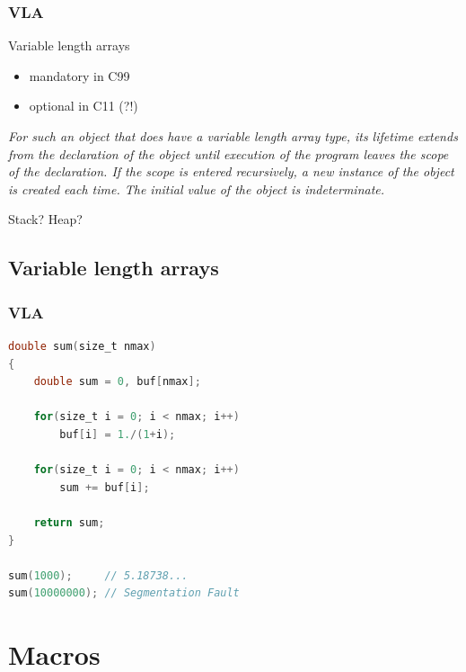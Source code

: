 \documentclass[12pt,compress]{beamer}
\begin{document}
\begin{frame}
    \frametitle{VLA}

    Variable length arrays
    \begin{itemize}
    \item mandatory in C99
    \item optional in C11 (?!)
    \end{itemize}

    \vfill

    {{\it For such an object that does have a variable length array type, its
    lifetime extends from the declaration of the object until execution of the
    program leaves the scope of the declaration. If the scope is entered
    recursively, a new instance of the object is created each time. The initial
    value of the object is indeterminate.}} 

    \vfill

    {
        \begin{center}
    {\Large    Stack? \quad Heap?    }
        \end{center}
    }

\end{frame}

\subsection{Variable length arrays}
\begin{frame}[fragile]
    \frametitle{VLA}

\begin{lstlisting}[language=C,basicstyle=\ttfamily,keywordstyle=\color{red}]
double sum(size_t nmax)
{
    double sum = 0, buf[nmax];

    for(size_t i = 0; i < nmax; i++)
        buf[i] = 1./(1+i);

    for(size_t i = 0; i < nmax; i++)
        sum += buf[i];

    return sum;
}

sum(1000);     // 5.18738...
sum(10000000); // Segmentation Fault
\end{lstlisting}
\end{frame}


\section{Macros}

\end{document}
